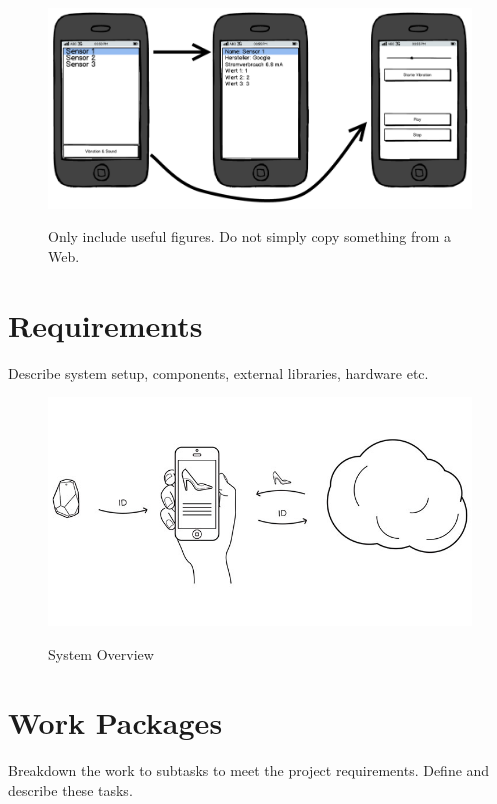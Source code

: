 \documentclass{report}
\newcommand{\lfig}[1]{\label{fig:#1}}
\begin{document}
\begin{figure}[h]
	\centering
    \includegraphics[width=\columnwidth]{example}
    \lfig{example}
    \vspace{-5mm} %
	\caption{Only include useful figures. Do not simply copy something from a Web.}
\end{figure}



\section{Requirements}
Describe system setup, components, external libraries, hardware etc.


\begin{figure}[h]
	\centering
    \includegraphics[width=\columnwidth]{overview.jpg}
    \lfig{system-overview}
    \vspace{-5mm} %
	\caption{System Overview~\cite{estimote}}
\end{figure}

\section{Work Packages}
Breakdown the work to subtasks to meet the project requirements.
Define and describe these tasks.
\end{document}
